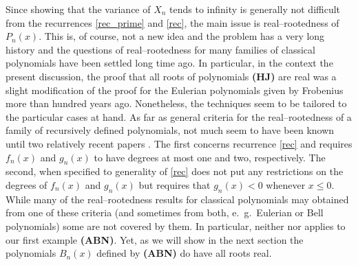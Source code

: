 \documentclass[10pt]{amsart}
\numberwithin{subcase}{case}
\begin{document}
Since showing that the variance of $X_n$ tends to infinity is generally not difficult from the recurrences \eqref{rec_prime} and \eqref{rec}, the main issue is real--rootedness of $P_n(x)$. This is, of course, not a new idea and the problem has a very long history and the questions of real--rootedness for many families of classical polynomials have been settled long time ago.  In particular, in the context the present discussion,  the proof that all roots of polynomials {\bf(HJ)} are real was a slight modification of the proof  for the Eulerian polynomials given by Frobenius \cite{F} more than hundred years ago. Nonetheless, the techniques seem to be tailored to the particular cases at hand. As far as general criteria for the real--rootedness of a family of recursively defined polynomials, not much seem to have been known until two relatively recent papers \cite{DDJ,LW}.    The first  concerns recurrence \eqref{rec} and requires  $f_n(x)$ and $g_n(x)$ to have degrees at most one and two, respectively. The second, when specified to generality of \eqref{rec} does not put any restrictions on the degrees of $f_n(x)$ and $g_n(x)$ but requires that $g_n(x)<0$ whenever $x\le0$. While many of the real--rootedness  results for classical polynomials may obtained from one of  these criteria (and sometimes from both, e.~g.~Eulerian or Bell polynomials) some  are not covered by them. In particular, neither \cite{DDJ} nor \cite{LW} applies to our first example {\bf(ABN)}. Yet, as we will show in the next section the polynomials $B_n(x)$ defined by {\bf(ABN)} do have all roots real. 
\end{document}
